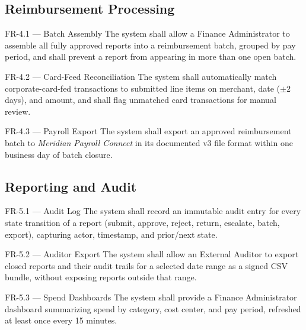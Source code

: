 \subsection{Reimbursement Processing}

\begin{reqbox}{FR-4.1 --- Batch Assembly}
The system shall allow a Finance Administrator to assemble all fully approved reports into a
reimbursement batch, grouped by pay period, and shall prevent a report from appearing in more
than one open batch. \hfill \priohigh
\end{reqbox}

\begin{reqbox}{FR-4.2 --- Card-Feed Reconciliation}
The system shall automatically match corporate-card-fed transactions to submitted line items
on merchant, date (\(\pm 2\) days), and amount, and shall flag unmatched card transactions for
manual review. \hfill \priomed
\end{reqbox}

\begin{reqbox}{FR-4.3 --- Payroll Export}
The system shall export an approved reimbursement batch to \textit{Meridian Payroll Connect}
in its documented v3 file format within one business day of batch closure. \hfill \priohigh
\end{reqbox}

\subsection{Reporting and Audit}

\begin{reqbox}{FR-5.1 --- Audit Log}
The system shall record an immutable audit entry for every state transition of a report
(submit, approve, reject, return, escalate, batch, export), capturing actor, timestamp, and
prior/next state. \hfill \priohigh
\end{reqbox}

\begin{reqbox}{FR-5.2 --- Auditor Export}
The system shall allow an External Auditor to export closed reports and their audit trails for
a selected date range as a signed CSV bundle, without exposing reports outside that range.
\hfill \priomed
\end{reqbox}

\begin{reqbox}{FR-5.3 --- Spend Dashboards}
The system shall provide a Finance Administrator dashboard summarizing spend by category, cost
center, and pay period, refreshed at least once every 15 minutes. \hfill \priolow
\end{reqbox}
